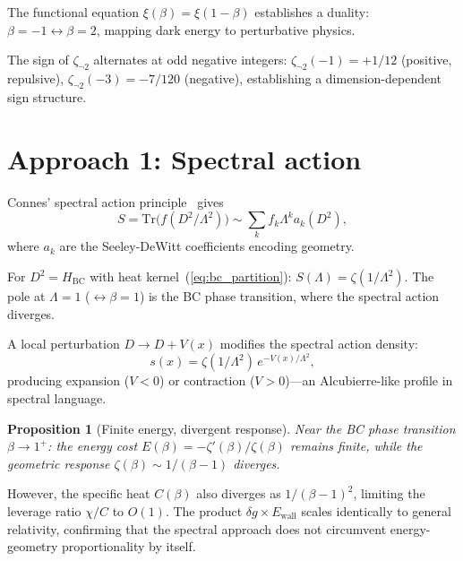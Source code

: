 \documentclass[aps,prd,twocolumn,superscriptaddress,nofootinbib]{revtex4-2}
\newtheorem{proposition}[theorem]{Proposition}
\newcommand{\Tr}{\mathrm{Tr}}
\begin{document}
The functional equation $\xi(\beta) = \xi(1-\beta)$ establishes a
duality: $\beta = -1 \leftrightarrow \beta = 2$, mapping dark energy
to perturbative physics.

The sign of $\zeta_{\neg 2}$ alternates at odd negative integers:
$\zeta_{\neg 2}(-1) = +1/12$ (positive, repulsive),
$\zeta_{\neg 2}(-3) = -7/120$ (negative), establishing a
dimension-dependent sign structure.

\section{Approach 1: Spectral action}
\label{sec:spectral}

Connes' spectral action principle~\cite{Chamseddine1996} gives
\begin{equation}
  S = \Tr\bigl(f(D^2/\Lambda^2)\bigr)
  \sim \sum_k f_k \Lambda^k a_k(D^2),
\end{equation}
where $a_k$ are the Seeley-DeWitt coefficients encoding geometry.

For $D^2 = H_{\mathrm{BC}}$ with heat kernel~(\ref{eq:bc_partition}):
$S(\Lambda) = \zeta(1/\Lambda^2)$.
The pole at $\Lambda = 1$ ($\leftrightarrow \beta = 1$) is the
BC phase transition, where the spectral action diverges.

A local perturbation $D \to D + V(x)$ modifies the spectral action
density:
\begin{equation}
  s(x) = \zeta(1/\Lambda^2) \, e^{-V(x)/\Lambda^2},
\end{equation}
producing expansion ($V < 0$) or contraction ($V > 0$)---an
Alcubierre-like profile in spectral language.

\begin{proposition}[Finite energy, divergent response]
Near the BC phase transition $\beta \to 1^+$: the energy cost
$E(\beta) = -\zeta'(\beta)/\zeta(\beta)$ remains finite,
while the geometric response $\zeta(\beta) \sim 1/(\beta-1)$
diverges.
\end{proposition}

However, the specific heat $C(\beta)$ also diverges as $1/(\beta-1)^2$,
limiting the leverage ratio $\chi/C$ to $O(1)$.
The product $\delta g \times E_{\mathrm{wall}}$ scales identically
to general relativity, confirming that the spectral approach does not
circumvent energy-geometry proportionality by itself.
\end{document}
